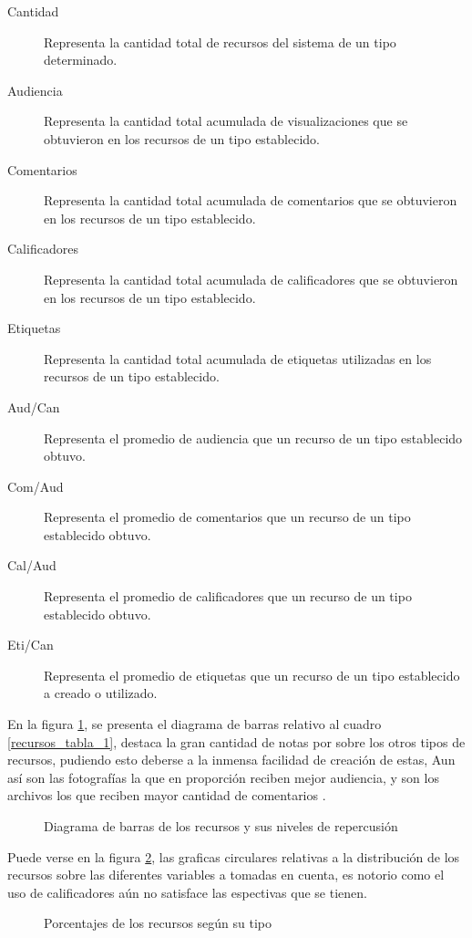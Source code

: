 \begin{description}
\item [Cantidad] Representa la cantidad total de recursos del sistema de un
tipo determinado.
\item [Audiencia] Representa la cantidad total acumulada de visualizaciones que
se obtuvieron en los recursos de un tipo establecido.
\item [Comentarios] Representa la cantidad total acumulada de comentarios que
se obtuvieron en los recursos de un tipo establecido.
\item [Calificadores] Representa la cantidad total acumulada de calificadores
que se obtuvieron en los recursos de un tipo establecido.
\item [Etiquetas] Representa la cantidad total acumulada de etiquetas utilizadas
en los recursos de un tipo establecido.
\item [Aud/Can] Representa el promedio de audiencia que un recurso de un tipo
establecido obtuvo.
\item [Com/Aud] Representa el promedio de comentarios que un recurso de un tipo
establecido obtuvo.
\item [Cal/Aud] Representa el promedio de calificadores que un recurso de un
tipo establecido obtuvo.
\item [Eti/Can] Representa el promedio de etiquetas que un recurso de un tipo
establecido a creado o utilizado.
\end{description}

En la figura \ref{recursos_bars_1}, se presenta el diagrama de barras relativo
al cuadro \ref{recursos_tabla_1}, destaca la gran cantidad de notas por sobre
los otros tipos de recursos, pudiendo esto deberse a la inmensa facilidad de
creación de estas, Aun así son las fotografías la que en proporción reciben
mejor audiencia, y son los archivos los que reciben mayor cantidad de 
comentarios
.
\begin{figure}
\centering

\caption{Diagrama de barras de los recursos y sus niveles de repercusión}
\label{recursos_bars_1}
\end{figure}

Puede verse en la figura \ref{recursos_pie_1}, las graficas circulares relativas
a la distribución de los recursos sobre las diferentes variables a tomadas en
cuenta, es notorio como el uso de calificadores aún no satisface las espectivas
que se tienen.

\begin{figure}
\centering

\caption{Porcentajes de los recursos según su tipo}
\label{recursos_pie_1}
\end{figure}

